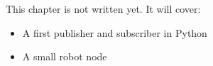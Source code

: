 \label{ch:ros5}
\begin{keyidea}
This chapter is not written yet. It will cover:
\begin{itemize}[nosep]
  \item A first publisher and subscriber in Python
  \item A small robot node
\end{itemize}
\end{keyidea}
